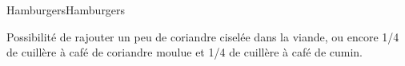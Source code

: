 \begin{recette}{Hamburgers}{Hamburgers}
\begin{conseils}
Possibilité de rajouter un peu de coriandre ciselée dans la viande, ou encore 1/4 de cuillère à café de coriandre moulue et 1/4 de cuillère à café de cumin.
\end{conseils}

\end{recette}